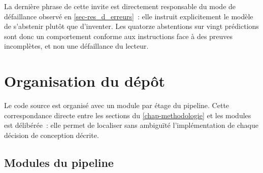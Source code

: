 La dernière phrase de cette invite est directement responsable du mode de
défaillance observé en \cref{sec-res_d_erreurs}~: elle instruit explicitement le
modèle de s'abstenir plutôt que d'inventer. Les quatorze abstentions sur vingt
prédictions sont donc un comportement conforme aux instructions face à des
preuves incomplètes, et non une défaillance du lecteur.

\chapter{Organisation du dépôt}
\label{annexe-depot}

Le code source est organisé avec un module par étage du pipeline. Cette
correspondance directe entre les sections du \cref{chap-methodologie} et les
modules est délibérée~: elle permet de localiser sans ambiguïté l'implémentation
de chaque décision de conception décrite.

\section{Modules du pipeline}

